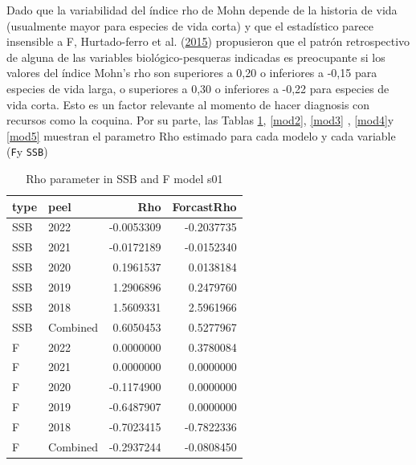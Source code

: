 \documentclass[
]{article}
\begin{document}
Dado que la variabilidad del índice rho de Mohn depende de la historia de vida (usualmente
mayor para especies de vida corta) y que el estadístico parece insensible a F, Hurtado-ferro et al. (\protect\hyperlink{ref-Hurtado2014}{2015})
propusieron que el patrón retrospectivo de alguna de las variables biológico-pesqueras indicadas es
preocupante si los valores del índice Mohn's rho son superiores a 0,20 o inferiores a -0,15 para especies
de vida larga, o superiores a 0,30 o inferiores a -0,22 para especies de vida corta. Esto es un factor relevante al momento de hacer diagnosis con recursos como la coquina.
Por su parte, las Tablas \ref{mod1}, \ref{mod2}, \ref{mod3} , \ref{mod4}y \ref{mod5} muestran el parametro Rho estimado para cada modelo y cada variable (\texttt{F}y \texttt{SSB})

\begin{table}[H]

\caption{\label{tab:unnamed-chunk-14}\label{mod1}Rho parameter in SSB and F model s01}
\centering
\begin{tabular}[t]{llrr}
\toprule
type & peel & Rho & ForcastRho\\
\midrule
SSB & 2022 & -0.0053309 & -0.2037735\\
SSB & 2021 & -0.0172189 & -0.0152340\\
SSB & 2020 & 0.1961537 & 0.0138184\\
SSB & 2019 & 1.2906896 & 0.2479760\\
SSB & 2018 & 1.5609331 & 2.5961966\\
\addlinespace
SSB & Combined & 0.6050453 & 0.5277967\\
F & 2022 & 0.0000000 & 0.3780084\\
F & 2021 & 0.0000000 & 0.0000000\\
F & 2020 & -0.1174900 & 0.0000000\\
F & 2019 & -0.6487907 & 0.0000000\\
\addlinespace
F & 2018 & -0.7023415 & -0.7822336\\
F & Combined & -0.2937244 & -0.0808450\\
\bottomrule
\end{tabular}
\end{table}
\end{document}
